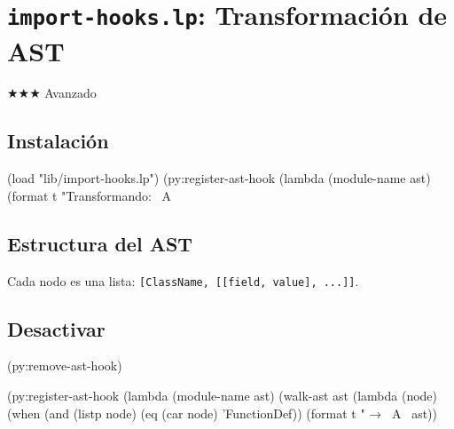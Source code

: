 \chapter{\texttt{import-hooks.lp}: Transformación de AST}
\label{chap:import-hooks}
{\huge$\bigstar$}{\huge$\bigstar$}{\huge$\bigstar$} Avanzado

\section{Instalación}
\begin{lispcode}
(load "lib/import-hooks.lp")
(py:register-ast-hook
  (lambda (module-name ast)
    (format t "Transformando: ~A~%
\end{lispcode}

\section{Estructura del AST}
Cada nodo es una lista: \texttt{[ClassName, [[field, value], ...]]}.

\section{Desactivar}
\begin{lispcode}
(py:remove-ast-hook)
\end{lispcode}

\begin{examplebox}[title=Hook que registra nombres de funciones]
\begin{lispcode}
(py:register-ast-hook
  (lambda (module-name ast)
    (walk-ast ast
      (lambda (node)
        (when (and (listp node) (eq (car node) 'FunctionDef))
          (format t "  → ~A~%
    ast))
\end{lispcode}
\end{examplebox}

